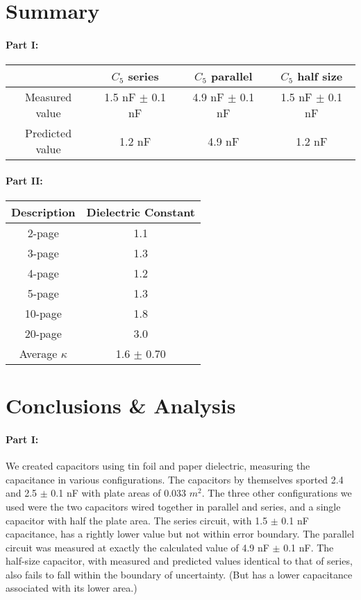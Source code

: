 \documentclass[11pt,letterpaper]{report}
\begin{document}

\pagebreak

\section*{Summary}
\paragraph{Part I:}
\begin{tabular}{ | c | c | c | c |}
\hline
 & $C_{5}$ series & $C_{5}$ parallel & $C_{5}$ half size \\
 \hline
Measured value & 1.5 nF $\pm$ 0.1 nF & 4.9 nF $\pm$ 0.1 nF & 1.5 nF $\pm$ 0.1 nF \\
Predicted value & 1.2 nF & 4.9 nF & 1.2 nF   \\

\hline
\end{tabular}

\paragraph{Part II:}
\begin{tabular}{ | c | c |}
\hline
Description & Dielectric Constant \\
\hline
2-page & 1.1 \\
3-page & 1.3 \\
4-page & 1.2 \\
5-page & 1.3 \\
10-page & 1.8 \\
20-page & 3.0 \\
\hline
Average $\kappa$ & 1.6 $\pm$ 0.70\\

\hline
\end{tabular}


\section*{Conclusions \& Analysis}
\paragraph{Part I:}
We created capacitors using tin foil and paper dielectric, measuring the capacitance in various configurations. The capacitors by themselves sported 2.4 and 2.5 $\pm$ 0.1 nF with plate areas of 0.033 $m^2$. The three other configurations we used were the two capacitors wired together in parallel and series, and a single capacitor with half the plate area. The series circuit, with 1.5 $\pm$ 0.1 nF capacitance, has a rightly lower value but not within error boundary. The parallel circuit was measured at exactly the calculated value of 4.9 nF $\pm$ 0.1 nF. The half-size capacitor, with measured and predicted values identical to that of series, also fails to fall within the boundary of uncertainty. (But has a lower capacitance associated with its lower area.)
\end{document}
